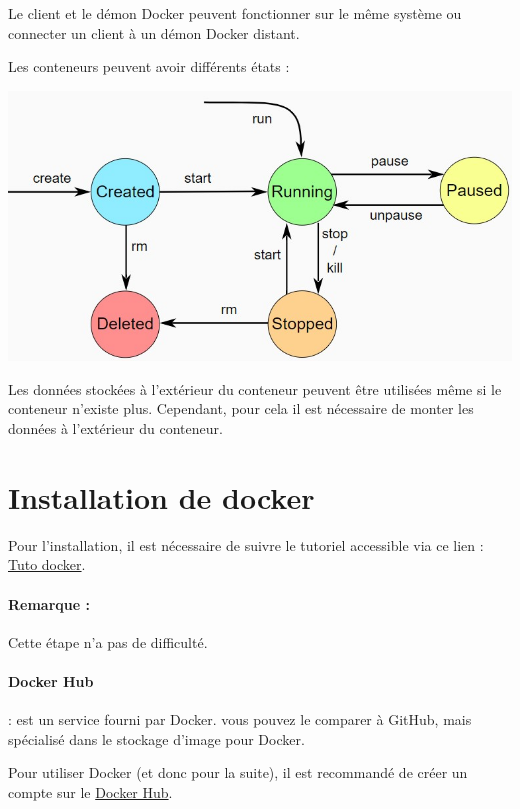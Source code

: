 \documentclass[french, 12pt]{article}%
\begin{document}
Le client et le démon Docker peuvent fonctionner sur le même système ou connecter un client à un démon Docker distant. 

 Les conteneurs peuvent avoir différents états : 
 
 \begin{center}
 \includegraphics[scale=0.7]{./ressource/docker_etat}
 \end{center}

Les données stockées à l'extérieur du conteneur peuvent être utilisées même si le conteneur n'existe plus. Cependant, pour cela il est nécessaire de monter les données à l'extérieur du conteneur.


\section{Installation de docker }

Pour l'installation, il est nécessaire de suivre le tutoriel accessible via ce lien : \href{https://practicalprogramming.fr/install-docker-windows/}{Tuto docker}.

\paragraph{Remarque : } Cette étape n'a pas de difficulté. 

\paragraph{Docker Hub } : est un service fourni par Docker. vous pouvez le comparer à GitHub, mais spécialisé dans le stockage d'image pour Docker.

Pour utiliser Docker (et donc pour la suite), il est recommandé de créer un compte sur le \href{https://hub.docker.com/}{Docker Hub}. 
\end{document}
